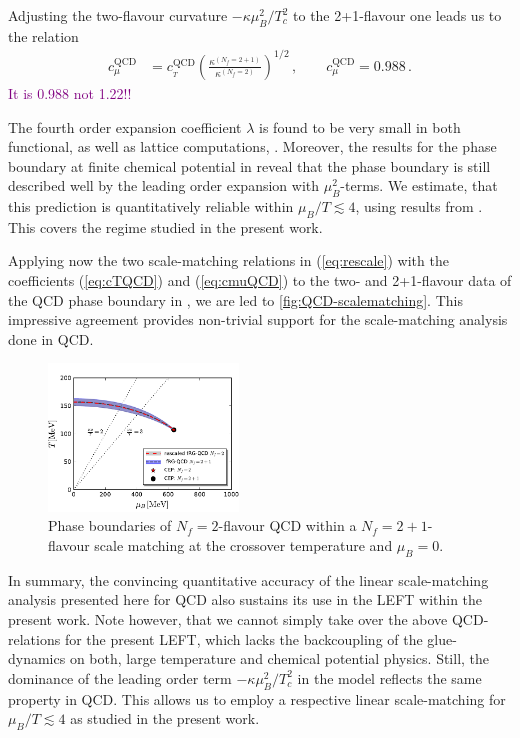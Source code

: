 \documentclass[%
reprint,
superscriptaddress,
showpacs,preprintnumbers,
amsmath,amssymb,
aps,
prd,
]{revtex4-1}
\def\eq#1{(\ref{#1})}
\newcommand{\colwj}[1]{\textcolor{Purple}{#1}}
\begin{document}
	Adjusting the two-flavour curvature $-\kappa \mu_B^2/T_c^2$ to the 2+1-flavour one leads us to the relation 
	\begin{align}
		c^\textrm{QCD}_{\mu}&=c^{\textrm{QCD}}_{_{T}}\left(\frac{\kappa^{(N_f=2+1)}}{\kappa^{(N_f=2)}}\right)^{1/2}\,, \qquad c_{\mu}^\textrm{QCD}=0.988 \,.\label{eq:cmuQCD}
	\end{align}
	\colwj{It is 0.988 not 1.22!!}
	
	The fourth order expansion coefficient $\lambda$ is found to be very small in both functional, \cite{Fu:2019hdw, Gao:2020fbl, Gao:2020qsj} as well as lattice computations, \cite{Bazavov:2018mes,Borsanyi:2020fev}. Moreover, the results for the phase boundary at finite chemical potential in \cite{Fu:2019hdw, Gao:2020fbl, Gao:2020qsj, Fischer:2018sdj} reveal that the phase boundary is still described well by the leading  order expansion with $\mu_B^2$-terms. We estimate, that this prediction is quantitatively reliable within $\mu_B/T\lesssim 4$, using results from \cite{Fu:2019hdw, Gao:2020fbl, Gao:2020qsj, Fischer:2018sdj, Braun:2019aow}. This covers the regime studied in the present work. 
	
	Applying now the two scale-matching relations in \eq{eq:rescale} with the coefficients \eq{eq:cTQCD} and \eq{eq:cmuQCD} to the two- and 2+1-flavour data of the QCD phase boundary in \cite{Fu:2019hdw}, we are led to \autoref{fig:QCD-scalematching}. This impressive agreement provides non-trivial support for the scale-matching analysis done in QCD. 
	\begin{figure}[t]
		\includegraphics[width=0.45\textwidth]{QCD-scalematching}
		\caption{Phase boundaries of $N_f=2$-flavour QCD within a $N_f=2+1$-flavour scale matching at the crossover temperature and $\mu_B=0$.}\label{fig:QCD-scalematching}
	\end{figure}
	
	In summary, the convincing quantitative accuracy of the linear scale-matching analysis presented here for QCD also sustains its use in the LEFT within the present work. Note however, that we cannot simply take over the above QCD-relations for the present LEFT, which lacks the backcoupling of the glue-dynamics on both, large temperature and chemical potential physics. Still, the dominance of the leading order term $-\kappa \mu_B^2/T_c^2$ in the model reflects the same property in QCD. This allows us to employ a respective linear scale-matching for $\mu_B/T\lesssim 4$ as studied in the present work. 
	
\end{document}
